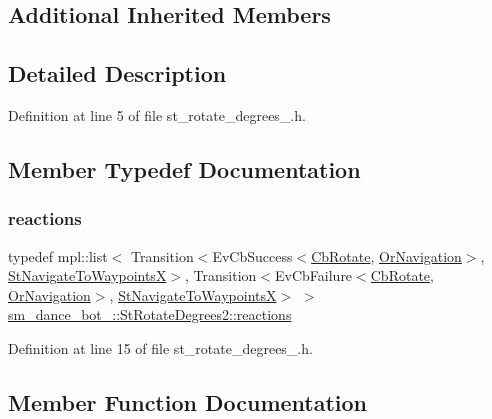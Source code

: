 \subsection*{Additional Inherited Members}


\subsection{Detailed Description}


Definition at line 5 of file st\+\_\+rotate\+\_\+degrees\+\_.\+h.



\subsection{Member Typedef Documentation}
\mbox{\label{structsm__dance__bot__2_1_1StRotateDegrees2_a14469da467433ec2e4853efebfadcc8c}} 
\subsubsection{\texorpdfstring{reactions}{reactions}}
{\footnotesize\ttfamily typedef mpl\+::list$<$ Transition$<$Ev\+Cb\+Success$<$\hyperlink{classcl__move__base__z_1_1CbRotate}{Cb\+Rotate}, \hyperlink{classsm__dance__bot__2_1_1OrNavigation}{Or\+Navigation}$>$, \hyperlink{structsm__dance__bot__2_1_1StNavigateToWaypointsX}{St\+Navigate\+To\+WaypointsX}$>$, Transition$<$Ev\+Cb\+Failure$<$\hyperlink{classcl__move__base__z_1_1CbRotate}{Cb\+Rotate}, \hyperlink{classsm__dance__bot__2_1_1OrNavigation}{Or\+Navigation}$>$, \hyperlink{structsm__dance__bot__2_1_1StNavigateToWaypointsX}{St\+Navigate\+To\+WaypointsX}$>$ $>$ \hyperlink{structsm__dance__bot__2_1_1StRotateDegrees2_a14469da467433ec2e4853efebfadcc8c}{sm\+\_\+dance\+\_\+bot\+\_\+::\+St\+Rotate\+Degrees2\+::reactions}}



Definition at line 15 of file st\+\_\+rotate\+\_\+degrees\+\_.\+h.



\subsection{Member Function Documentation}
\mbox{\label{structsm__dance__bot__2_1_1StRotateDegrees2_a9a886efc7aab77c8473eb60a12c2e85c}} 
